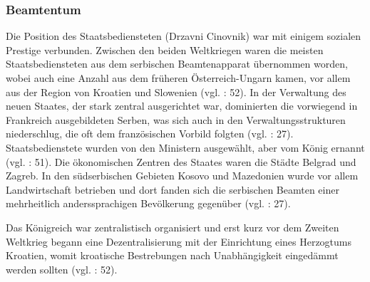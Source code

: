 \subsubsection{Beamtentum}
Die Position des Staatsbediensteten (Drzavni Cinovnik) war mit einigem sozialen Prestige verbunden. Zwischen den beiden Weltkriegen waren die meisten Staatsbediensteten aus dem serbischen Beamtenapparat übernommen worden, wobei auch eine Anzahl aus dem früheren Österreich-Ungarn kamen, vor allem aus der Region von Kroatien und Slowenien (vgl. \cite{sevic} : 52). In der Verwaltung des neuen Staates, der stark zentral ausgerichtet war, dominierten die vorwiegend in Frankreich ausgebildeten Serben, was sich auch in den Verwaltungsstrukturen niederschlug, die oft dem französischen Vorbild folgten (vgl. \cite{beardradin} : 27). Staatsbedienstete wurden von den Ministern ausgewählt, aber vom König ernannt (vgl. \cite{sevic} : 51). Die ökonomischen Zentren des Staates waren die Städte Belgrad und Zagreb. In den südserbischen Gebieten Kosovo und Mazedonien wurde vor allem Landwirtschaft betrieben und dort fanden sich die serbischen Beamten einer mehrheitlich anderssprachigen Bevölkerung gegenüber (vgl. \cite{beardradin} : 27).\par
Das Königreich war zentralistisch organisiert und erst kurz vor dem Zweiten Weltkrieg begann eine Dezentralisierung mit der Einrichtung eines Herzogtums Kroatien, womit kroatische Bestrebungen nach Unabhängigkeit eingedämmt werden sollten (vgl. \cite{sevic} : 52).\par

